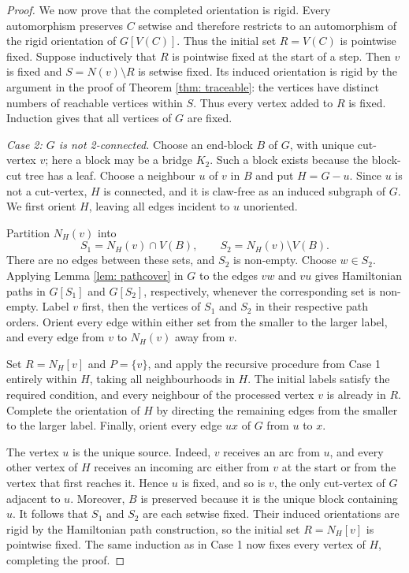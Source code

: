 \documentclass[a4paper,12pt]{elsarticle}
\begin{document}
\begin{proof}
We now prove that the completed orientation is rigid. Every automorphism preserves $C$ setwise and therefore restricts to an automorphism of the rigid orientation of $G[V(C)]$. Thus the initial set $R=V(C)$ is pointwise fixed. Suppose inductively that $R$ is pointwise fixed at the start of a step. Then $v$ is fixed and $S=N(v)\setminus R$ is setwise fixed. Its induced orientation is rigid by the argument in the proof of Theorem \ref{thm: traceable}: the vertices have distinct numbers of reachable vertices within $S$. Thus every vertex added to $R$ is fixed. Induction gives that all vertices of $G$ are fixed.

\emph{Case 2: $G$ is not 2-connected.}
Choose an end-block $B$ of $G$, with unique cut-vertex $v$; here a block may be a bridge $K_2$. Such a block exists because the block-cut tree has a leaf. Choose a neighbour $u$ of $v$ in $B$ and put $H=G-u$. Since $u$ is not a cut-vertex, $H$ is connected, and it is claw-free as an induced subgraph of $G$. We first orient $H$, leaving all edges incident to $u$ unoriented.

Partition $N_H(v)$ into
\[
S_1=N_H(v)\cap V(B),\qquad S_2=N_H(v)\setminus V(B).
\]
There are no edges between these sets, and $S_2$ is non-empty. Choose $w\in S_2$. Applying Lemma \ref{lem: pathcover} in $G$ to the edges $vw$ and $vu$ gives Hamiltonian paths in $G[S_1]$ and $G[S_2]$, respectively, whenever the corresponding set is non-empty. Label $v$ first, then the vertices of $S_1$ and $S_2$ in their respective path orders. Orient every edge within either set from the smaller to the larger label, and every edge from $v$ to $N_H(v)$ away from $v$.

Set $R=N_H[v]$ and $P=\{v\}$, and apply the recursive procedure from Case 1 entirely within $H$, taking all neighbourhoods in $H$. The initial labels satisfy the required condition, and every neighbour of the processed vertex $v$ is already in $R$. Complete the orientation of $H$ by directing the remaining edges from the smaller to the larger label. Finally, orient every edge $ux$ of $G$ from $u$ to $x$.

The vertex $u$ is the unique source. Indeed, $v$ receives an arc from $u$, and every other vertex of $H$ receives an incoming arc either from $v$ at the start or from the vertex that first reaches it. Hence $u$ is fixed, and so is $v$, the only cut-vertex of $G$ adjacent to $u$. Moreover, $B$ is preserved because it is the unique block containing $u$. It follows that $S_1$ and $S_2$ are each setwise fixed. Their induced orientations are rigid by the Hamiltonian path construction, so the initial set $R=N_H[v]$ is pointwise fixed. The same induction as in Case 1 now fixes every vertex of $H$, completing the proof.
\end{proof}
\end{document}
